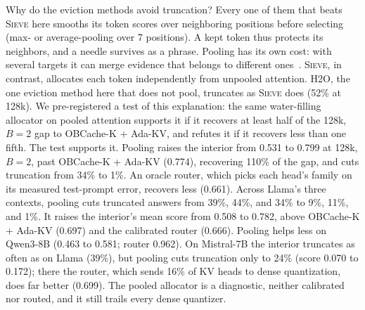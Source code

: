 \documentclass{article}
\newcommand{\sieve}{\textsc{Sieve}}
\theoremstyle{definition}
\begin{document}
Why do the eviction methods avoid truncation?  Every one of them that beats \sieve{} here smooths its token scores over neighboring positions before selecting (max- or average-pooling over 7 positions).  A kept token thus protects its neighbors, and a needle survives as a phrase.  Pooling has its own cost: with several targets it can merge evidence that belongs to different ones~\citep{zhang2026fixedcontract}.  \sieve{}, in contrast, allocates each token independently from unpooled attention.  H2O, the one eviction method here that does not pool, truncates as \sieve{} does (52\% at 128k).  We pre-registered a test of this explanation: the same water-filling allocator on pooled attention supports it if it recovers at least half of the 128k, $B=2$ gap to OBCache-K + Ada-KV, and refutes it if it recovers less than one fifth.  The test supports it.  Pooling raises the interior from 0.531 to 0.799 at 128k, $B=2$, past OBCache-K + Ada-KV (0.774), recovering 110\% of the gap, and cuts truncation from 34\% to 1\%.  An oracle router, which picks each head's family on its measured test-prompt error, recovers less (0.661).  Across Llama's three contexts, pooling cuts truncated answers from 39\%, 44\%, and 34\% to 9\%, 11\%, and 1\%.  It raises the interior's mean score from 0.508 to 0.782, above OBCache-K + Ada-KV (0.697) and the calibrated router (0.666).  Pooling helps less on Qwen3-8B (0.463 to 0.581; router 0.962).  On Mistral-7B the interior truncates as often as on Llama (39\%), but pooling cuts truncation only to 24\% (score 0.070 to 0.172); there the router, which sends 16\% of KV heads to dense quantization, does far better (0.699).  The pooled allocator is a diagnostic, neither calibrated nor routed, and it still trails every dense quantizer.
\end{document}
